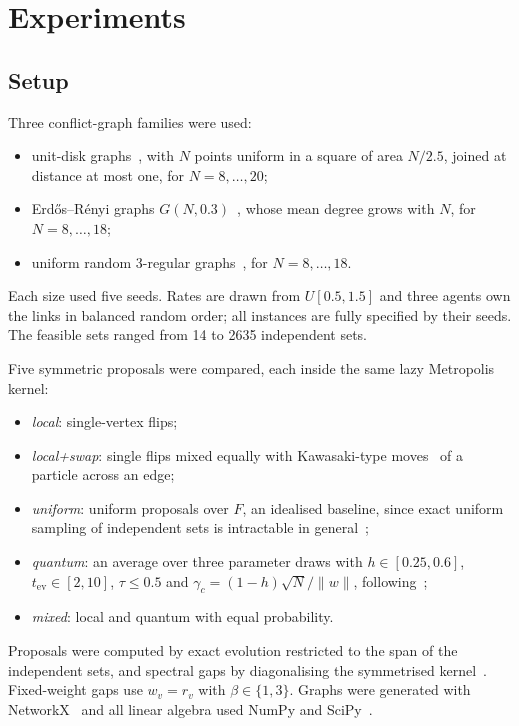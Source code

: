 \documentclass[11pt,a4paper]{article}
\begin{document}
\section{Experiments}

\subsection{Setup}
Three conflict-graph families were used:
\begin{itemize}[leftmargin=*]
\item unit-disk graphs~\cite{clark1990unit}, with $N$ points uniform in a square of area $N/2.5$,
joined at distance at most one, for $N=8,\dots,20$;
\item Erd\H{o}s--R\'enyi graphs $G(N,0.3)$~\cite{erdos1960evolution}, whose mean degree grows
with $N$, for $N=8,\dots,18$;
\item uniform random 3-regular graphs~\cite{wormald1999models}, for $N=8,\dots,18$.
\end{itemize}
Each size used five seeds. Rates are drawn from $U[0.5,1.5]$ and three agents own the links in
balanced random order; all instances are fully specified by their seeds. The feasible sets ranged
from 14 to 2635 independent sets.

Five symmetric proposals were compared, each inside the same lazy Metropolis kernel:
\begin{itemize}[leftmargin=*]
\item \emph{local}: single-vertex flips;
\item \emph{local+swap}: single flips mixed equally with Kawasaki-type
moves~\cite{kawasaki1966diffusion} of a particle across an edge;
\item \emph{uniform}: uniform proposals over $F$, an idealised baseline, since exact uniform
sampling of independent sets is intractable in
general~\cite{provan1983complexity,dyer2002counting,mossel2009hardness,sly2010computational};
\item \emph{quantum}: an average over three parameter draws with $h\in[0.25,0.6]$,
$t_{\mathrm{ev}}\in[2,10]$, $\tau\le0.5$ and $\gamma_c=(1-h)\sqrt N/\|w\|$,
following~\cite{layden2023quantum};
\item \emph{mixed}: local and quantum with equal probability.
\end{itemize}
Proposals were computed by exact evolution restricted to the span of the independent sets, and spectral gaps by diagonalising
the symmetrised kernel~\cite{levin2017markov}. Fixed-weight gaps use $w_v=r_v$ with
$\beta\in\{1,3\}$. Graphs were generated with NetworkX~\cite{hagberg2008exploring} and all linear
algebra used NumPy and SciPy~\cite{harris2020array,virtanen2020scipy}.
\end{document}
